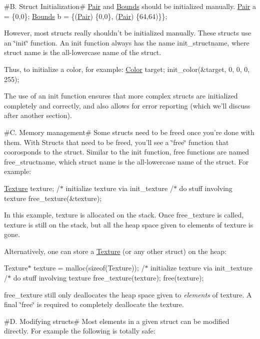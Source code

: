 \#\-B. Struct Initialization\# \hyperlink{struct_pair}{Pair} and \hyperlink{struct_bounds}{Bounds} should be initialized manually. {\ttfamily \hyperlink{struct_pair}{Pair} a = \{0,0\};} {\ttfamily \hyperlink{struct_bounds}{Bounds} b = \{(\hyperlink{struct_pair}{Pair}) \{0,0\}, (\hyperlink{struct_pair}{Pair}) \{64,64)\}\};}

However, most structs really shouldn't be initialized manually. These structs use an \char`\"{}init\char`\"{} function. An init function always has the name init\-\_\-structname, where struct name is the all-\/lowercase name of the struct.

Thus, to initialize a color, for example\-: \hyperlink{struct_color}{Color} target; {\ttfamily init\-\_\-color(\&target, 0, 0, 0, 255);}

The use of an init function ensures that more complex structs are initialized completely and correctly, and also allows for error reporting (which we'll discuss after another section).

\#\-C. Memory management\# Some structs need to be freed once you're done with them. With Structs that need to be freed, you'll see a \char`\"{}free\char`\"{} function that coorosponds to the struct. Similar to the init function, free functions are named free\-\_\-structname, which struct name is the all-\/lowercase name of the struct. For example\-:

{\ttfamily \hyperlink{struct_texture}{Texture} texture;} {\ttfamily /$\ast$ initialize texture via init\-\_\-texture} {\ttfamily /$\ast$ do stuff involving texture} {\ttfamily free\-\_\-texture(\&texture);}

In this example, texture is allocated on the stack. Once free\-\_\-texture is called, texture is still on the stack, but all the heap space given to elements of texture is gone.

Alternatively, one can store a \hyperlink{struct_texture}{Texture} (or any other struct) on the heap\-:

{\ttfamily Texture$\ast$ texture = malloc(sizeof(\-Texture));} {\ttfamily /$\ast$ initialize texture via init\-\_\-texture} {\ttfamily /$\ast$ do stuff involving texture} {\ttfamily free\-\_\-texture(texture);} {\ttfamily free(texture);}

free\-\_\-texture still only deallocates the heap space given to {\itshape elements} of texture. A final \char`\"{}free\char`\"{} is required to completely deallocate the texture.

\#\-D. Modifying structs\# Most elements in a given struct can be modified directly. For example the following is totally safe\-:

